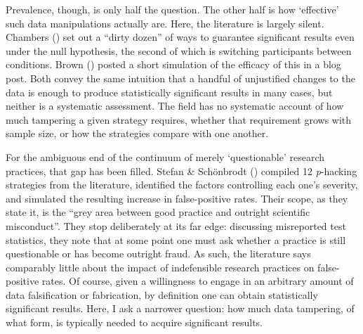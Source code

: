 \documentclass[
  nonatbib,
  authoryear,
  preprint]{elsarticle}
\begin{document}
Prevalence, though, is only half the question. The other half is how
`effective' such data manipulations actually are. Here, the literature
is largely silent. Chambers ()
set out a ``dirty dozen'' of ways to guarantee significant results even
under the null hypothesis, the second of which is switching participants
between conditions. Brown ()
posted a short simulation of the efficacy of this in a blog post. Both
convey the same intuition that a handful of unjustified changes to the
data is enough to produce statistically significant results in many
cases, but neither is a systematic assessment. The field has no
systematic account of how much tampering a given strategy requires,
whether that requirement grows with sample size, or how the strategies
compare with one another.

For the ambiguous end of the continuum of merely `questionable' research
practices, that gap has been filled. Stefan \& Schönbrodt
() compiled 12 \emph{p}-hacking
strategies from the literature, identified the factors controlling each
one's severity, and simulated the resulting increase in false-positive
rates. Their scope, as they state it, is the ``grey area between good
practice and outright scientific misconduct''. They stop deliberately at
its far edge: discussing misreported test statistics, they note that at
some point one must ask whether a practice is still questionable or has
become outright fraud. As such, the literature says comparably little
about the impact of indefensible research practices on false-positive
rates. Of course, given a willingness to engage in an arbitrary amount
of data falsification or fabrication, by definition one can obtain
statistically significant results. Here, I ask a narrower question: how
much data tampering, of what form, is typically needed to acquire
significant results.
\end{document}
